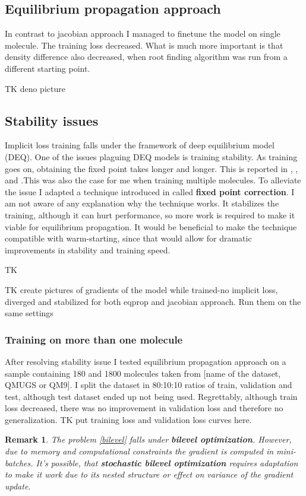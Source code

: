 \documentclass[a4paper,10pt]{report}
\newtheorem{remark}{Remark}
\begin{document}
\subsection{Equilibrium propagation approach}
In contrast to jacobian approach I managed to finetune the model on single molecule.
The training loss decreased. What is much more important is that density difference also decreased, when root finding algorithm was run from a different starting point.




TK deno picture
\subsection{Stability issues}
Implicit loss training falls under the framework of deep equilibrium model (DEQ). One of the issues plaguing DEQ models is training stability. As training goes on, obtaining the fixed point takes longer and longer. This is reported in \cite{opticalflow}, \cite{bai2021stabilizing}, \cite{burger2025dequify} and \cite{geng2023torchdeq}.This was also the case for me when training multiple molecules. To alleviate the issue I adapted a technique introduced in \cite{opticalflow} called \textbf{fixed point correction}. I am not aware of any explanation why the technique works. It stabilizes the training, although it can hurt performance, so more work is required to make it viable for equilibrium propagation.
It would be beneficial to make the technique compatible with warm-starting, since that would allow for dramatic improvements in stability and training speed.


TK

TK create pictures of gradients of the model while trained-no implicit loss, diverged and stabilized for both eqprop and jacobian approach.
Run them on the same settings
\subsubsection{Training on more than one molecule}
After resolving stability issue I tested equilibrium propagation approach on a sample containing 180 and 1800 molecules taken from [name of the dataset, QMUGS or QM9]. I split the dataset in 80:10:10 ratios of train, validation and test, although test dataset ended up not being used. Regrettably, although train loss decreased, there was no improvement in validation loss and therefore no generalization.
TK put training loss and validation loss curves here.

\begin{remark}
 The problem \ref{bilevel} falls under \textbf{bilevel optimization}. However, due to memory and computational constraints the gradient is computed in mini-batches. It's possible, that \textbf{stochastic bilevel optimization} requires adaptation to make it work due to its nested structure or effect on variance of the gradient update.
\end{remark}
\newpage
\end{document}
